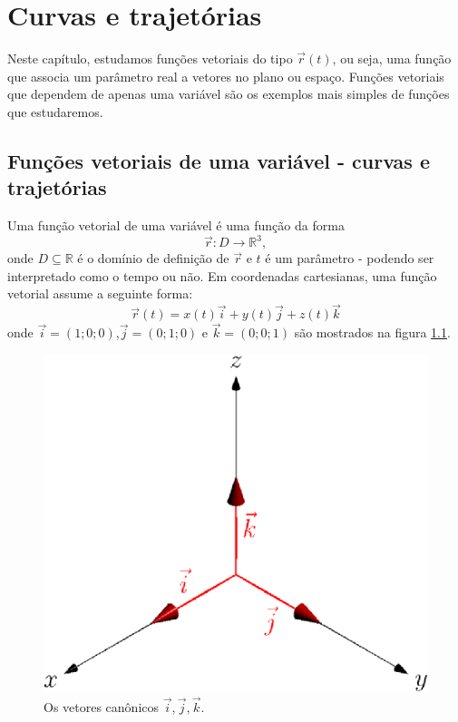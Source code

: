 

\chapter{Curvas e trajetórias}
  Neste capítulo, estudamos funções vetoriais do tipo $\vec{r}(t)$, ou seja, uma função que associa um parâmetro real a vetores no plano ou espaço. Funções vetoriais que dependem de apenas uma variável são os exemplos mais simples de funções que estudaremos. %

\section{Funções vetoriais de uma variável - curvas e trajetórias}
Uma função vetorial de uma variável é uma função da forma $$\vec{r}:D\to \mathbb{R}^3,$$ onde $D\subseteq \mathbb{R}$ é o domínio de definição de $\vec{r}$ e $t$ é um parâmetro - podendo ser interpretado como o tempo ou não. Em coordenadas cartesianas, uma função vetorial assume a seguinte forma:
$$\vec{r}(t)=x(t)\vec{i}+y(t)\vec{j}+z(t)\vec{k}$$
onde $\vec{i}=(1;0;0)$,$\vec{j}=(0;1;0)$ e $\vec{k}=(0;0;1)$ são mostrados na figura \ref{fig_vetijk}.

\begin{figure} \label{fig_vetijk}
\begin{center}
    \includegraphics{./cap_curvas/figs/vetores_ijk}
 \caption{Os vetores canônicos $\vec{i},\vec{j},\vec{k}$.}
  \end{center}
\end{figure}

